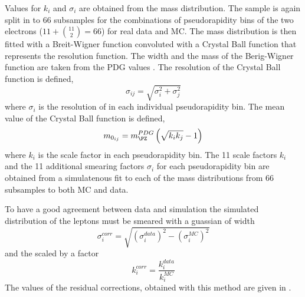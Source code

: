 Values for $k_{i}$ and $\sigma_{i}$ are obtained from the
\HepProcess{\PZ\to\Pe\Pe} mass distribution. The \HepProcess{\PZ\to\Pe\Pe}
sample is again split in to 66 subsamples for the combinations of pseudorapidity
bins of the two electrons ($11+\binom{11}{2} = 66$) for real data and \ac{MC}.
The \HepProcess{\PZ\to\Pe\Pe} mass distribution is then fitted with a
Breit-Wigner function convoluted with a Crystal Ball function that represents
the resolution function. The width and the mass of the Berig-Wigner function are
taken from the PDG values \cite{}. The resolution of the Crystal Ball function
is defined,
\begin{equation}
\sigma_{ij} = \sqrt{\sigma_{i}^{2} + \sigma_{j}^{2}}
\end{equation}
where $\sigma_{i}$ is the resolution of in each individual pseudorapidity bin.
The mean value of the Crystal Ball function is defined,
\begin{equation}
m_{0_{ij}} = m_{\PZ}^{PDG} 
          \left( \sqrt{k_{i} k_{j}} - 1 \right)
\end{equation}
where $k_{i}$ is the scale factor in each pseudorapidity bin.  The 11 scale
factors $k_{i}$ and the 11 additional smearing factors $\sigma_{i}$ for each
pseudorapidity bin are obtained from a simulatenous fit to each of the mass
distributions from 66 subsamples to both \ac{MC} and data. 

To have a good agreement between data and simulation the simulated \pT
distribution of the leptons must be smeared with a guassian of width
\begin{equation}
\sigma^{corr}_{i} = 
\sqrt{
\left(\sigma^{data}_{i}\right)^{2} -
\left(\sigma^{MC}_{i}  \right)^{2}
}
\end{equation}
and the scaled by a factor 
\begin{equation}
k^{corr}_i = \frac{ k^{data}_i}{k^{MC}_i}
\end{equation}
The values of the
residual corrections, obtained with this method are given in
.

